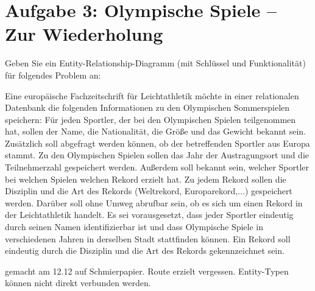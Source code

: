 \documentclass{lehramt-informatik}
\begin{document}
%

\section{Aufgabe 3: Olympische Spiele – Zur Wiederholung}

Geben Sie ein Entity-Relationship-Diagramm (mit Schlüssel und
Funktionalität) für folgendes Problem an:

Eine europäische Fachzeitschrift für Leichtathletik möchte in einer
relationalen Datenbank die folgenden Informationen zu den Olympischen
Sommerspielen speichern: Für jeden Sportler, der bei den Olympischen
Spielen teilgenommen hat, sollen der Name, die Nationalität, die Größe
und das Gewicht bekannt sein. Zusätzlich soll abgefragt werden können,
ob der betreffenden Sportler aus Europa stammt. Zu den Olympischen
Spielen sollen das Jahr der Austragungsort und die Teilnehmerzahl
gespeichert werden. Außerdem soll bekannt sein, welcher Sportler bei
welchen Spielen welchen Rekord erzielt hat. Zu jedem Rekord sollen die
Disziplin und die Art des Rekords (Weltrekord, Europarekord,...)
gespeichert werden. Darüber soll ohne Umweg abrufbar sein, ob es sich um
einen Rekord in der Leichtathletik handelt. Es sei vorausgesetzt, dass
jeder Sportler eindeutig durch seinen Namen identifizierbar ist und dass
Olympische Spiele in verschiedenen Jahren in derselben Stadt stattfinden
können. Ein Rekord soll eindeutig durch die Disziplin und die Art des
Rekords gekennzeichnet sein.

\begin{antwort}[falsch]
gemacht am 12.12 auf Schmierpapier. Route erzielt vergessen. Entity-Typen
können nicht direkt verbunden werden.
\end{antwort}

%



%


\end{document}
